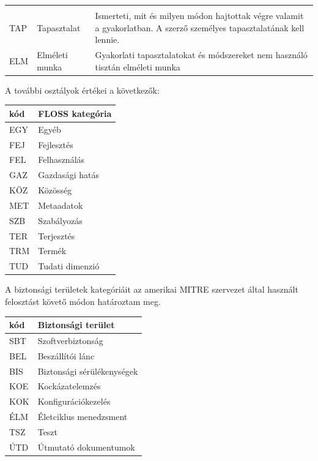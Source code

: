 \documentclass[12pt,magyar,a4paper,oneside]{scrreprt}
\begin{document}
\begin{longtable}[]{@{}lll@{}}
\begin{minipage}[t]{0.52\columnwidth}
\end{minipage}\tabularnewline
\begin{minipage}[t]{0.05\columnwidth}\raggedright
TAP\strut
\end{minipage} & \begin{minipage}[t]{0.34\columnwidth}\raggedright
Tapasztalat\strut
\end{minipage} & \begin{minipage}[t]{0.52\columnwidth}\raggedright
Ismerteti, mit és milyen módon hajtottak végre valamit a gyakorlatban. A
szerző személyes tapasztalatának kell lennie.\strut
\end{minipage}\tabularnewline
\begin{minipage}[t]{0.05\columnwidth}\raggedright
ELM\strut
\end{minipage} & \begin{minipage}[t]{0.34\columnwidth}\raggedright
Elméleti munka\strut
\end{minipage} & \begin{minipage}[t]{0.52\columnwidth}\raggedright
Gyakorlati tapasztalatokat és módszereket nem használó tisztán elméleti
munka\strut
\end{minipage}\tabularnewline
\bottomrule
\end{longtable}

A további osztályok értékei a következők:

\begin{longtable}[]{@{}ll@{}}
\toprule
kód & FLOSS kategória\tabularnewline
\midrule
\endhead
EGY & Egyéb\tabularnewline
FEJ & Fejlesztés\tabularnewline
FEL & Felhasználás\tabularnewline
GAZ & Gazdasági hatás\tabularnewline
KÖZ & Közösség\tabularnewline
MET & Metaadatok\tabularnewline
SZB & Szabályozás\tabularnewline
TER & Terjesztés\tabularnewline
TRM & Termék\tabularnewline
TUD & Tudati dimenzió\tabularnewline
\bottomrule
\end{longtable}

A biztonsági területek kategóriáit az amerikai MITRE szervezet által
használt felosztást követő módon határoztam meg.

\begin{longtable}[]{@{}ll@{}}
\toprule
kód & Biztonsági terület\tabularnewline
\midrule
\endhead
SBT & Szoftverbiztonság\tabularnewline
BEL & Beszállítói lánc\tabularnewline
BIS & Biztonsági sérülékenységek\tabularnewline
KOE & Kockázatelemzés\tabularnewline
KOK & Konfigurációkezelés\tabularnewline
ÉLM & Életciklus menedzsment\tabularnewline
TSZ & Teszt\tabularnewline
ÚTD & Útmutató dokumentumok\tabularnewline
\bottomrule
\end{longtable}
\end{document}

